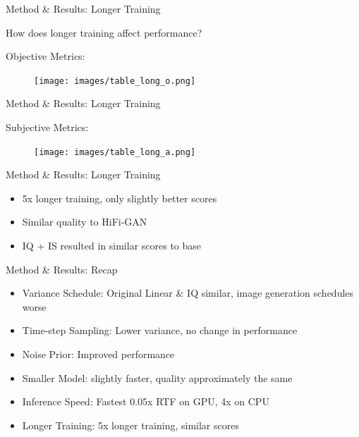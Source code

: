 \documentclass{beamer}
\begin{document}

\begin{frame}{Method \& Results: Longer Training}

    How does longer training affect performance?

    \vspace{0.5cm}

    Objective Metrics:

    \begin{figure}
        \centering
        \texttt{[image: images/table\_long\_o.png]}
    \end{figure}

\end{frame}


\begin{frame}{Method \& Results: Longer Training}

    Subjective Metrics:

    \begin{figure}
        \centering
        \texttt{[image: images/table\_long\_a.png]}
    \end{figure}

\end{frame}


\begin{frame}{Method \& Results: Longer Training}

    \begin{itemize}
        \setlength\itemsep{1.5em}
        \item 5x longer training, only slightly better scores
        \pause
        \item Similar quality to HiFi-GAN
        \pause
        \item IQ + IS resulted in similar scores to base

    \end{itemize}

\end{frame}


\begin{frame}{Method \& Results: Recap}

    \begin{itemize}
        \setlength\itemsep{1em}
        \item Variance Schedule: Original Linear \& IQ similar, image generation schedules worse
        \pause
        \item Time-step Sampling: Lower variance, no change in performance
        \pause
        \item Noise Prior: Improved performance
        \pause
        \item Smaller Model: slightly faster, quality approximately the same
        \pause
        \item Inference Speed: Fastest 0.05x RTF on GPU, 4x on CPU
        \pause
        \item Longer Training: 5x longer training, similar scores
    \end{itemize}

\end{frame}
\end{document}
